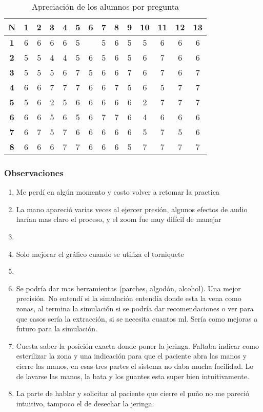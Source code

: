 \begin{table}[H]
\centering
\begin{tabulary}{\textwidth}{cccccccccccccc}
\toprule
\textbf{N}      & \textbf{1} & \textbf{2} & \textbf{3} & \textbf{4} & \textbf{5}
& \textbf{6} & \textbf{7} & \textbf{8} & \textbf{9} & \textbf{10} & \textbf{11}
& \textbf{12} & \textbf{13} \\
\midrule
\textbf{1}      & 6 & 6 & 6 & 6 & 5 &   & 5 & 6 & 5 & 5  & 6  & 6  & 6  \\
\textbf{2}      & 5 & 5 & 4 & 4 & 5 & 6 & 5 & 6 & 5 & 6  & 7  & 6  & 6  \\
\textbf{3}      & 5 & 5 & 5 & 6 & 7 & 5 & 6 & 6 & 7 & 6  & 7  & 6  & 7  \\
\textbf{4}      & 6 & 6 & 7 & 7 & 7 & 6 & 6 & 7 & 5 & 6  & 5  & 7  & 7  \\
\textbf{5}      & 5 & 6 & 2 & 5 & 6 & 6 & 6 & 6 & 6 & 2  & 7  & 7  & 7  \\
\textbf{6}      & 6 & 6 & 5 & 6 & 5 & 6 & 7 & 7 & 6 & 4  & 6  & 6  & 6  \\ 
\textbf{7}      & 6 & 7 & 5 & 7 & 6 & 6 & 6 & 6 & 6 & 5  & 7  & 5  & 6  \\ 
\textbf{8}      & 6 & 6 & 6 & 7 & 7 & 6 & 6 & 6 & 5 & 7  & 7  & 7  & 7  \\ 
\bottomrule
\end{tabulary}
\caption{Apreciación de los alumnos por pregunta} 
\end{table}

\subsubsection{Observaciones}

\begin{enumerate}
\item Me perdí en algún momento y costo volver a retomar la practica
\item La mano apareció varias veces al ejercer presión, algunos efectos de audio
    harían mas claro el proceso, y el zoom fue muy difícil de manejar
\item 
\item Solo mejorar el gráfico cuando se utiliza el torniquete
\item 
\item Se podría dar mas herramientas (parches, algodón, alcohol). Una mejor
    precisión. No entendí si la simulación entendía donde esta la vena como
    zonas, al termina la simulación si se podría dar recomendaciones o ver para
    que casos sería la extracción, si se necesita cuantos ml. Sería como mejoras
    a futuro para la simulación.
\item Cuesta saber la posición exacta donde poner la jeringa. Faltaba indicar
    como esterilizar la zona y una indicación para que el paciente abra las
    manos y cierre las manos, en esas tres partes el sistema no daba mucha
    facilidad. Lo de lavarse las manos, la bata y los guantes esta super bien
    intuitivamente.
\item La parte de hablar y solicitar al paciente que cierre el puño no me
    pareció intuitivo, tampoco el de desechar la jeringa.
\end{enumerate}

